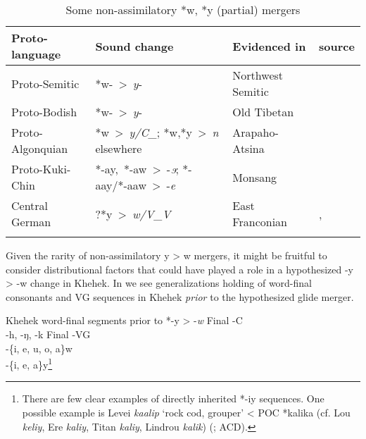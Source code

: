 \documentclass[output=paper]{langscibook}
\begin{document}
\begin{table}
\begin{tabularx}{\textwidth}{QQQQ}
\lsptoprule
{Proto-language} & {Sound} {change} & {Evidenced} {in} & {source}\\
\midrule
Proto-Semitic & \mbox{*w- > \textit{y}-} & Northwest Semitic & \citet{Suchard2019}\\
Proto-Bodish & \mbox{*w- > \textit{y}-} & Old Tibetan & \citet{Hill2019}\\
\mbox{Proto-Algonquian} & \mbox{*w > \textit{y/C\_};} \mbox{*w,*y > \textit{n}} elsewhere & Arapaho-Atsina & \citet[106--107]{Goddard1974}\\
Proto-Kuki-Chin & \mbox{*-ay, *-aw > -\textit{ɘ}}; \mbox{*-aay/*-aaw > -\textit{e}} & Monsang & \citet{Konnerth2018}\\
Central German & \mbox{?*y > \textit{w/V\_V}} & East Franconian & \citet[243]{Kümmel2007}, \citet{Armborst1979}\\
\lspbottomrule
\end{tabularx}
\caption{\label{tab:blevins:3} Some non-assimilatory *w, *y (partial) mergers}
\end{table}

Given the rarity of non-assimilatory y > w mergers, it might be fruitful to consider distributional factors that could have played a role in a hypothesized -y > -w change in Khehek.  In  we see generalizations holding of word-final consonants and VG sequences in Khehek \textit{prior} to the hypothesized glide merger.

\ea%
    \label{ex:blevins:4}Khehek word-final segments prior to *-y > -\textit{w}
    \ea Final -C\\\relax*-h, -ŋ, -k      
    \ex Final -VG\\\relax *-\{i, e, u, o, a\}w\\\relax*-\{i, e, a\}y\footnote{There are few clear examples of directly inherited *-iy sequences. One possible example is Levei \textit{kaalip} ‘rock cod, grouper’ < POC *kalika (cf. Lou \textit{keliy}, Ere \textit{kaliy}, Titan \textit{kaliy}, Lindrou \textit{kalik}) (\citealt[230--231]{Blust1995}; ACD).}
    \z
\z
\end{document}
